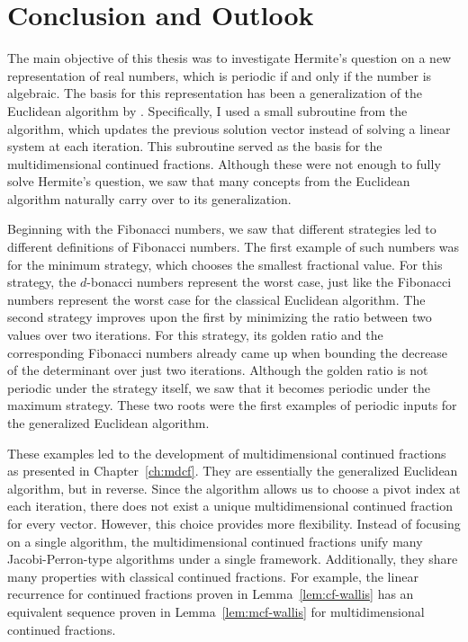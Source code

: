 \chapter{Conclusion and Outlook}
\label{ch:conclusion}

The main objective of this thesis
was to investigate Hermite's question
on a new representation of real numbers,
which is periodic if and only if the number is algebraic.
The basis for this representation has been a generalization of the Euclidean
algorithm by \citeauthor{Klein24}.
Specifically, I used a small subroutine from the algorithm,
which updates the previous solution vector instead of solving a linear system
at each iteration.
This subroutine served as the basis for the multidimensional continued fractions.
Although these were not enough to fully solve Hermite's question,
we saw that many concepts from the Euclidean algorithm naturally carry
over to its generalization.

Beginning with the Fibonacci numbers,
we saw that different strategies led to different definitions of Fibonacci numbers.
The first example of such numbers was for the minimum strategy,
which chooses the smallest fractional value.
For this strategy, the $d$-bonacci numbers represent the worst case,
just like the Fibonacci numbers represent the worst case for the classical
Euclidean algorithm.
The second strategy improves upon the first by minimizing the ratio between two values over two iterations.
For this strategy, its golden ratio and the corresponding Fibonacci numbers
already came up when bounding the decrease of the determinant over just two iterations.
Although the golden ratio is not periodic under the strategy itself,
we saw that it becomes periodic under the maximum strategy.
These two roots were the first examples of periodic inputs for the generalized
Euclidean algorithm.

These examples led to the development of multidimensional continued fractions
as presented in Chapter~\ref{ch:mdcf}.
They are essentially the generalized Euclidean algorithm, but in reverse.
Since the algorithm allows us to choose a pivot index at each iteration,
there does not exist a unique multidimensional continued fraction for every vector.
However, this choice provides more flexibility.
Instead of focusing on a single algorithm, the multidimensional continued
fractions unify many Jacobi-Perron-type algorithms under a single framework.
Additionally, they share many properties with classical continued fractions.
For example, the linear recurrence for continued fractions proven in Lemma~\ref{lem:cf-wallis}
has an equivalent sequence proven in Lemma~\ref{lem:mcf-wallis} for
multidimensional continued fractions.

